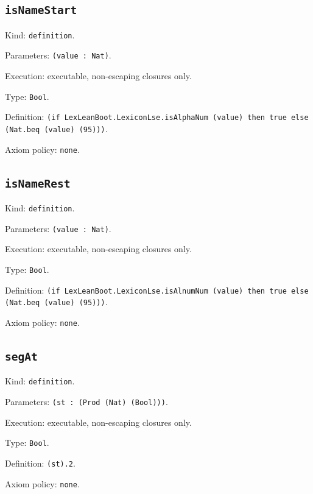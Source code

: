 \documentclass[11pt]{article}
\begin{document}
\subsection*{\texttt{isNameStart}}
\noindent Kind: \texttt{definition}.\par
\noindent Parameters: \texttt{(value : Nat)}.\par
\noindent Execution: executable, non-escaping closures only.\par
\noindent Type: \texttt{Bool}.\par
\noindent Definition: \texttt{(if LexLeanBoot.LexiconLse.isAlphaNum (value) then true else (Nat.beq (value) (95)))}.\par
\noindent Axiom policy: \texttt{none}.\par
\subsection*{\texttt{isNameRest}}
\noindent Kind: \texttt{definition}.\par
\noindent Parameters: \texttt{(value : Nat)}.\par
\noindent Execution: executable, non-escaping closures only.\par
\noindent Type: \texttt{Bool}.\par
\noindent Definition: \texttt{(if LexLeanBoot.LexiconLse.isAlnumNum (value) then true else (Nat.beq (value) (95)))}.\par
\noindent Axiom policy: \texttt{none}.\par
\subsection*{\texttt{segAt}}
\noindent Kind: \texttt{definition}.\par
\noindent Parameters: \texttt{(st : (Prod (Nat) (Bool)))}.\par
\noindent Execution: executable, non-escaping closures only.\par
\noindent Type: \texttt{Bool}.\par
\noindent Definition: \texttt{(st).2}.\par
\noindent Axiom policy: \texttt{none}.\par
\end{document}
